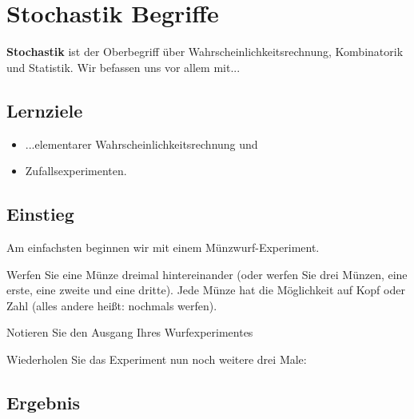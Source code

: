 
\section{Stochastik Begriffe}


\textbf{Stochastik} ist der Oberbegriff über
Wahrscheinlichkeitsrechnung, Kombinatorik und Statistik. Wir befassen
uns vor allem mit...

\subsection*{Lernziele}
\begin{itemize}
	\item ...elementarer Wahrscheinlichkeitsrechnung und
	\item Zufallsexperimenten.
\end{itemize}


\subsection*{Einstieg}
Am einfachsten beginnen wir mit einem Münzwurf-Experiment.

Werfen Sie eine Münze dreimal hintereinander (oder werfen Sie drei
Münzen, eine erste, eine zweite und eine dritte). Jede Münze hat die
Möglichkeit auf Kopf oder Zahl (alles andere heißt: nochmals werfen).

Notieren Sie den Ausgang Ihres Wurfexperimentes


\TRAINER{\vspace{24mm}}

Wiederholen Sie das Experiment nun noch weitere drei Male:



\newpage



\subsection{Ergebnis}

